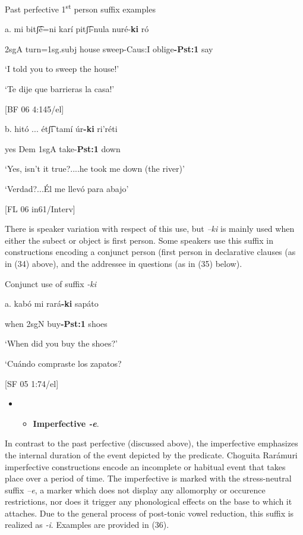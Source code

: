    Past perfective 1\textsuperscript{st} person suffix examples

a.    mi   bitʃ͡é=ni   karí   pitʃ͡í-nula   nuré-\textbf{ki}   ró

  2sgA  turn=1sg.subj  house  sweep-Caus:I  oblige\textbf{{}-Pst:1}  say

  ‘I told you to sweep the house!’  

‘Te dije que barrieras la casa!’      

[BF 06 4:145/el]

b.   hitó ...  étʃ͡i   tamí   úr\textbf{{}-ki}     ri’réti

yes  Dem  1sgA  take-\textbf{Pst:1}  down

‘Yes, isn’t it true?....he took me down (the river)’

‘Verdad?...Él me llevó para abajo’      

[FL 06 in61/Interv]

There is speaker variation with respect of this use, but \textit{–ki} is mainly used when either the subect or object is first person. Some speakers use this suffix in constructions encoding a conjunct person (first person in declarative clauses (as in (34) above), and the addressee in questions (as in (35) below).

   Conjunct use of suffix \textit{{}-ki}

a.   kabó   mi   rará\textbf{{}-ki}   sapáto

when   2sgN   buy\textbf{{}-Pst:1}   shoes

‘When did you buy the shoes?’

‘Cuándo compraste los zapatos?      

[SF 05 1:74/el]

\begin{itemize}
\item \begin{itemize}
\item \textbf{Imperfective \textit{{}-e}}.
\end{itemize}
\end{itemize}

In contrast to the past perfective (discussed above), the imperfective emphasizes the internal duration of the event depicted by the predicate. Choguita Rarámuri imperfective constructions encode an incomplete or habitual event that takes place over a period of time. The imperfective is marked  with the stress-neutral suffix \textit{–e}, a marker which does not display any allomorphy or occurence restrictions, nor does it trigger any phonological effects on the base to which it attaches. Due to the general process of post-tonic vowel reduction, this suffix is realized as \textit{{}-i}. Examples are provided in (36).


